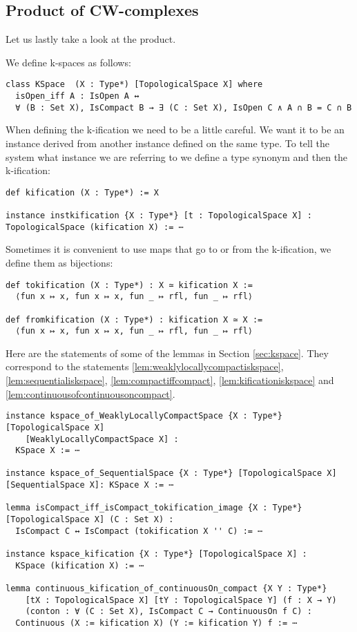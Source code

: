 \subsection{Product of CW-complexes}

Let us lastly take a look at the product. 

We define k-spaces as follows: 

\begin{lstlisting}
class KSpace  (X : Type*) [TopologicalSpace X] where
  isOpen_iff A : IsOpen A ↔
  ∀ (B : Set X), IsCompact B → ∃ (C : Set X), IsOpen C ∧ A ∩ B = C ∩ B
\end{lstlisting}

When defining the k-ification we need to be a little careful. 
We want it to be an instance derived from another instance defined on the same type. 
To tell the system what instance we are referring to we define a type synonym and then the k-ification: 

\begin{lstlisting}
def kification (X : Type*) := X

instance instkification {X : Type*} [t : TopologicalSpace X] : TopologicalSpace (kification X) := ⋯
\end{lstlisting}

Sometimes it is convenient to use maps that go to or from the k-ification, we define them as bijections:

\begin{lstlisting}
def tokification (X : Type*) : X ≃ kification X :=
  ⟨fun x ↦ x, fun x ↦ x, fun _ ↦ rfl, fun _ ↦ rfl⟩
  
def fromkification (X : Type*) : kification X ≃ X :=
  ⟨fun x ↦ x, fun x ↦ x, fun _ ↦ rfl, fun _ ↦ rfl⟩
\end{lstlisting}

Here are the statements of some of the lemmas in Section \ref{sec:kspace}. 
They correspond to the statements \ref{lem:weaklylocallycompactiskspace}, \ref{lem:sequentialiskspace}, \ref{lem:compactiffcompact}, \ref{lem:kificationiskspace} and \ref{lem:continuousofcontinuousoncompact}.

\begin{lstlisting}
instance kspace_of_WeaklyLocallyCompactSpace {X : Type*}[TopologicalSpace X]
    [WeaklyLocallyCompactSpace X] : 
  KSpace X := ⋯

instance kspace_of_SequentialSpace {X : Type*} [TopologicalSpace X] [SequentialSpace X]: KSpace X := ⋯

lemma isCompact_iff_isCompact_tokification_image {X : Type*} [TopologicalSpace X] (C : Set X) :
  IsCompact C ↔ IsCompact (tokification X '' C) := ⋯

instance kspace_kification {X : Type*} [TopologicalSpace X] : 
  KSpace (kification X) := ⋯

lemma continuous_kification_of_continuousOn_compact {X Y : Type*} 
    [tX : TopologicalSpace X] [tY : TopologicalSpace Y] (f : X → Y) 
    (conton : ∀ (C : Set X), IsCompact C → ContinuousOn f C) :
  Continuous (X := kification X) (Y := kification Y) f := ⋯
\end{lstlisting}

